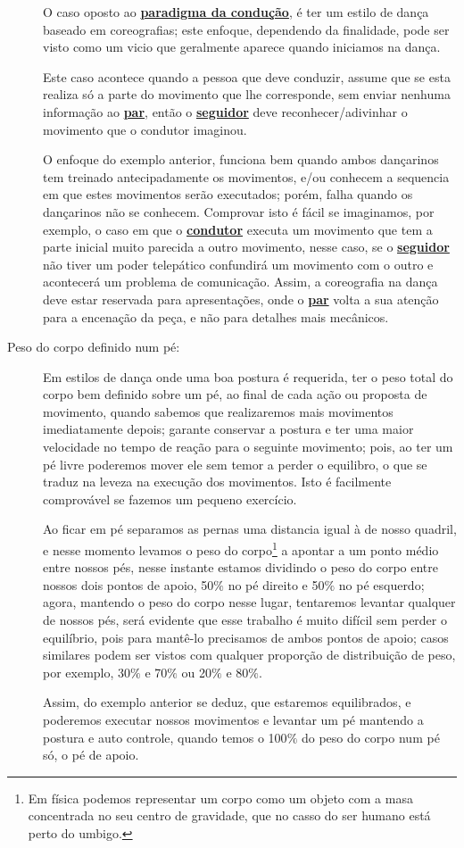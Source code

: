 \begin{description}
O caso oposto ao \hyperref[def:ParadigmaConducao]{\textbf{paradigma da condução}}, é ter um estilo de dança baseado em coreografias;
este enfoque, dependendo da finalidade, pode ser visto como um vicio que geralmente aparece quando iniciamos
na dança. 
\begin{example}
Este caso acontece quando a pessoa que deve conduzir, assume que se esta realiza só a parte do movimento 
que lhe corresponde, sem enviar nenhuma informação ao \hyperref[def:Par]{\textbf{par}}, 
então o \hyperref[def:Seguidor]{\textbf{seguidor}} deve reconhecer/adivinhar o movimento que o condutor imaginou.
\end{example} 
O enfoque do exemplo anterior, funciona bem quando ambos dançarinos tem treinado antecipadamente os movimentos, 
e/ou conhecem a sequencia em que estes movimentos serão executados; 
porém, falha quando os dançarinos não se conhecem.
Comprovar isto é fácil se imaginamos, por exemplo, o caso em que o \hyperref[def:Condutor]{\textbf{condutor}} executa um movimento
que tem a parte inicial muito parecida a outro movimento, nesse caso, se o \hyperref[def:Seguidor]{\textbf{seguidor}} não tiver
um poder telepático confundirá um movimento com o outro e acontecerá um problema de comunicação. Assim, a coreografia
na dança deve estar reservada para apresentações, onde o \hyperref[def:Par]{\textbf{par}} volta 
a sua atenção para a encenação da peça, e não para detalhes mais mecânicos.

\item[Peso do corpo definido num pé:] Em estilos de dança onde uma boa postura é requerida,
ter o peso total do corpo bem definido sobre um pé, 
ao final de cada ação ou proposta de movimento,
quando sabemos que realizaremos mais movimentos imediatamente depois;
garante conservar a postura e ter uma maior velocidade no tempo de reação para o seguinte movimento;
pois, ao ter um pé livre poderemos mover ele sem temor a perder o equilibro, 
o que se traduz na leveza na execução dos movimentos. 
Isto é facilmente comprovável se fazemos um pequeno exercício. 
\begin{example}
Ao ficar em pé separamos as
pernas uma distancia igual à de nosso quadril, e nesse momento levamos o peso do corpo\footnote{
Em física podemos representar um corpo como um objeto com a masa concentrada no seu centro de gravidade, 
que no casso do ser humano está perto do umbigo.} a
apontar a um ponto médio entre nossos pés, nesse instante estamos dividindo o peso do corpo
entre nossos dois pontos de apoio, 50$\%$ no pé direito e 50$\%$ no pé esquerdo; agora, mantendo o peso
do corpo nesse lugar, tentaremos levantar qualquer de nossos pés, será evidente
que esse trabalho é muito difícil sem perder o equilíbrio, pois para mantê-lo
precisamos de ambos pontos de apoio; casos similares podem ser vistos com qualquer proporção de distribuição de peso,
por exemplo, 30$\%$ e 70$\%$ ou 20$\%$ e 80$\%$. 
\end{example}
Assim, do exemplo anterior se deduz, que estaremos
equilibrados, e poderemos executar nossos movimentos e levantar um pé 
mantendo a postura e auto controle, quando
temos o 100$\%$ do peso do corpo num pé só, o pé de apoio.
 

\end{description}
